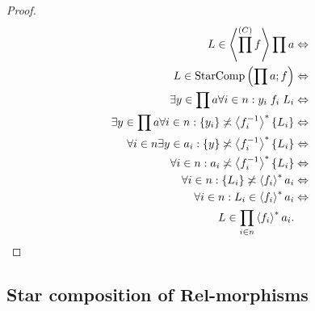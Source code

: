\begin{proof}
~
\begin{align*}
L\in\left\langle \prod^{(C)}f\right\rangle\prod a & \Leftrightarrow\\
L\in\operatorname{StarComp}\left(\prod a;f\right) & \Leftrightarrow\\
\exists y\in\prod a\forall i\in n:y_{i}\mathrel{f_{i}}L_{i} & \Leftrightarrow\\
\exists y\in\prod a\forall i\in n:\{y_{i}\}\not\asymp\left\langle f_{i}^{-1}\right\rangle ^{\ast}\{L_{i}\} & \Leftrightarrow\\
\forall i\in n\exists y\in a_{i}:\{y\}\not\asymp\left\langle f_{i}^{-1}\right\rangle ^{\ast}\{L_{i}\} & \Leftrightarrow\\
\forall i\in n:a_{i}\not\asymp\left\langle f_{i}^{-1}\right\rangle ^{\ast}\{L_{i}\} & \Leftrightarrow\\
\forall i\in n:\{L_{i}\}\not\asymp\left\langle f_{i}\right\rangle ^{\ast}a_{i} & \Leftrightarrow\\
\forall i\in n:L_{i}\in\left\langle f_{i}\right\rangle ^{\ast}a_{i} & \Leftrightarrow\\
L\in\prod_{i\in n}\left\langle f_{i}\right\rangle ^{\ast}a_{i}.
\end{align*}

\end{proof}

\subsection{Star composition of $\mathbf{Rel}$-morphisms}

